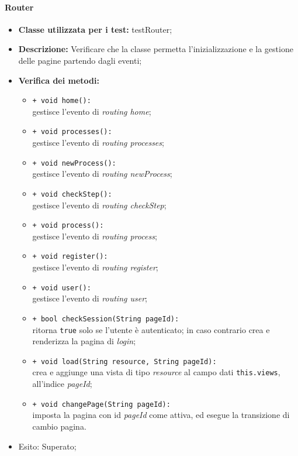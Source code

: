 \paragraph{Router}
\begin{flushleft}
\begin{itemize}
\item \textbf{Classe utilizzata per i test:} testRouter;
\item \textbf{Descrizione:} Verificare che la classe permetta l'inizializzazione e la gestione delle pagine partendo dagli eventi;
\item \textbf{Verifica dei metodi:}
\begin{sloppypar}
\begin{itemize}
\item \texttt{+ void home():}\\ gestisce l'evento di \textit{routing home};
\item \texttt{+ void processes():}\\ gestisce l'evento di \textit{routing processes};
\item \texttt{+ void newProcess():}\\ gestisce l'evento di \textit{routing newProcess};
\item \texttt{+ void checkStep():}\\ gestisce l'evento di \textit{routing checkStep};
\item \texttt{+ void process():}\\ gestisce l'evento di \textit{routing process};
\item \texttt{+ void register():}\\ gestisce l'evento di \textit{routing register};
\item \texttt{+ void user():}\\ gestisce l'evento di \textit{routing user};
\item \texttt{+ bool checkSession(String pageId):}\\ ritorna \texttt{true} solo se l'utente è autenticato; in caso contrario crea e renderizza la pagina di \textit{login};
\item \texttt{+ void load(String resource, String pageId):}\\ crea e aggiunge una vista di tipo \textit{resource} al campo dati \texttt{this.views}, all'indice \textit{pageId};
\item \texttt{+ void changePage(String pageId):}\\ imposta la pagina con id \textit{pageId} come attiva, ed esegue la transizione di cambio pagina.
\end{itemize}
\end{sloppypar}
\item Esito: Superato;
\end{itemize}
\end{flushleft}


